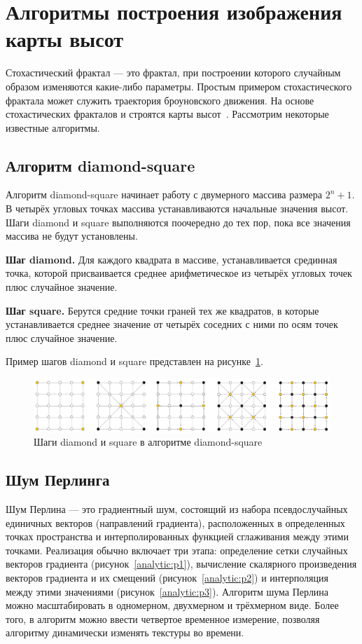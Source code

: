 \documentclass[a4paper, 14pt]{extreport}
\begin{document}
\section{Алгоритмы построения изображения карты высот}

Стохастический фрактал --- это фрактал, при построении которого случайным образом изменяются какие-либо параметры. 
Простым примером стохастического фрактала может служить траектория броуновского движения. На основе стохастических
фракталов и строятся карты высот~\cite{fractal}. Рассмотрим некоторые известные алгоритмы.

\subsection{Алгоритм diamond-square}

Алгоритм diamond-square начинает работу с двумерного массива размера $2^n + 1$. В четырёх угловых точках массива 
устанавливаются начальные значения высот. Шаги diamond и square выполняются поочередно до тех пор, пока все значения 
массива не будут установлены.~\cite{landscape}

\textbf{Шаг diamond.} Для каждого квадрата в массиве, устанавливается срединная точка, которой присваивается среднее
арифметическое из четырёх угловых точек плюс случайное значение.

\textbf{Шаг square.} Берутся средние точки граней тех же квадратов, в которые устанавливается среднее значение от четырёх 
соседних с ними по осям точек плюс случайное значение.

Пример шагов diamond и square представлен на рисунке~\ref{analytic:ds}.
\begin{figure}[h]
	\centering
	\includegraphics[scale=0.5]{tools/diamond-square.png}
	\caption{Шаги diamond и square в алгоритме diamond-square}
	\label{analytic:ds}
\end{figure}

\subsection{Шум Перлинга}

Шум Перлина --- это градиентный шум, состоящий из набора псевдослучайных единичных векторов (направлений градиента), 
расположенных в определенных точках пространства и интерполированных функцией сглаживания между этими точками. 
Реализация обычно включает три этапа: определение сетки случайных векторов градиента (рисунок~\ref{analytic:p1}), 
вычисление скалярного произведения векторов градиента и их смещений (рисунок~\ref{analytic:p2}) и интерполяция между 
этими значениями (рисунок~\ref{analytic:p3}). Алгоритм шума Перлина можно масштабировать в одномерном, двухмерном и 
трёхмерном виде. Более того, в алгоритм можно ввести четвертое временное измерение, позволяя алгоритму динамически 
изменять текстуры во времени.~\cite{landscape}
\end{document}
